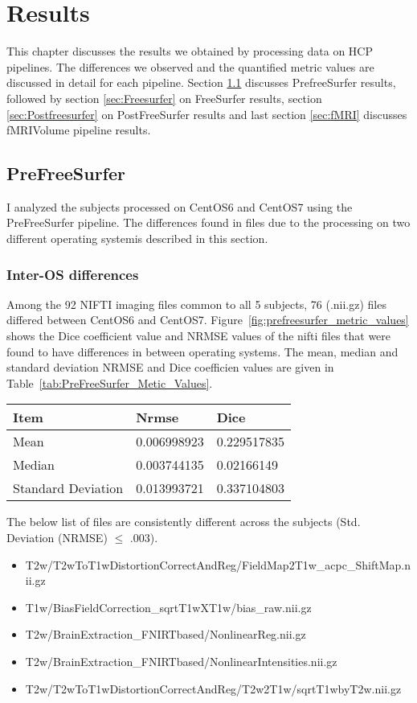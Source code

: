 \chapter{Results}
This chapter discusses the results we obtained by processing data on HCP pipelines. The differences we observed and the quantified metric values are discussed in detail for each pipeline. Section \ref{sec:Prefreesurfer} discusses PrefreeSurfer results, followed by section \ref{sec:Freesurfer} on FreeSurfer results, section \ref{sec:Postfreesurfer} on PostFreeSurfer results and last section \ref{sec:fMRI} discusses fMRIVolume pipeline results.

\section{PreFreeSurfer} \label{sec:Prefreesurfer}
I analyzed the subjects processed on CentOS6 and CentOS7 using the PreFreeSurfer pipeline. The differences found in files due to the processing on two different operating systemis described in this section.

\subsection{Inter-OS differences}
Among the 92 NIFTI imaging files common to all 5 subjects, 76 (.nii.gz) files differed between CentOS6 and CentOS7. Figure~\ref{fig:prefreesurfer_metric_values} shows the Dice coefficient value and NRMSE values of the nifti files that were found to have differences in between operating systems. The mean, median and standard deviation NRMSE and Dice coefficien values are given in Table~\ref{tab:PreFreeSurfer_Metic_Values}.
\hfill \break
\begin{center}
\begin{tabular}{|l|l|l|}
\hline
  \textbf{Item}               & \textbf{Nrmse}       & \textbf{Dice}        \\ \hline
Mean               & 0.006998923 & 0.229517835 \\ \hline
Median             & 0.003744135 & 0.02166149  \\ \hline
Standard Deviation & 0.013993721 & 0.337104803 \\ \hline
\end{tabular}
\label{tab:PreFreeSurfer_Metic_Values}
\end{center}
\hfill \break
The below list of files  are consistently different across the subjects (Std. Deviation (NRMSE) $\leq$ .003).
\begin{itemize} 
  \item T2w/T2wToT1wDistortionCorrectAndReg/FieldMap2T1w\_acpc\_ShiftMap.nii.gz
  \item T1w/BiasFieldCorrection\_sqrtT1wXT1w/bias\_raw.nii.gz
  \item T2w/BrainExtraction\_FNIRTbased/NonlinearReg.nii.gz
  \item T2w/BrainExtraction\_FNIRTbased/NonlinearIntensities.nii.gz
  \item T2w/T2wToT1wDistortionCorrectAndReg/T2w2T1w/sqrtT1wbyT2w.nii.gz
\end{itemize}

